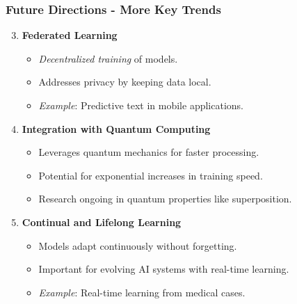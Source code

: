 \documentclass[aspectratio=169]{beamer}
\begin{document}
\begin{frame}[fragile]
    \frametitle{Future Directions - More Key Trends}
    \begin{enumerate}
        \setcounter{enumi}{2}
        \item \textbf{Federated Learning}
        \begin{itemize}
            \item \textit{Decentralized training} of models.
            \item Addresses privacy by keeping data local.
            \item \textit{Example}: Predictive text in mobile applications.
        \end{itemize}

        \item \textbf{Integration with Quantum Computing}
        \begin{itemize}
            \item Leverages quantum mechanics for faster processing.
            \item Potential for exponential increases in training speed.
            \item Research ongoing in quantum properties like superposition.
        \end{itemize}

        \item \textbf{Continual and Lifelong Learning}
        \begin{itemize}
            \item Models adapt continuously without forgetting.
            \item Important for evolving AI systems with real-time learning.
            \item \textit{Example}: Real-time learning from medical cases.
        \end{itemize}
    \end{enumerate}
\end{frame}
\end{document}
